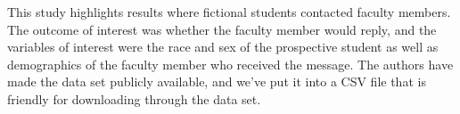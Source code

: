 \begin{itemize}
    This study highlights results where fictional students
    contacted faculty members.
    The outcome of interest was whether the faculty member
    would reply, and the variables of interest were the
    race and sex of the prospective student as well as
    demographics of the faculty member who received the message.
    The authors have made the data set publicly available,
    and we've put it into a CSV file that is friendly
    for downloading through the  data set.

\end{itemize}

